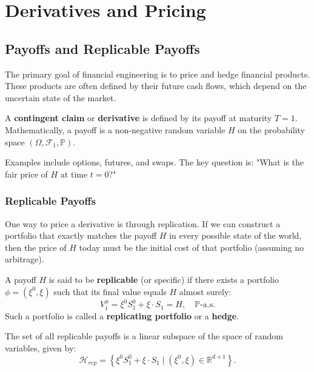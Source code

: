 \chapter{Derivatives and Pricing}

\section{Payoffs and Replicable Payoffs}

The primary goal of financial engineering is to price and hedge financial products. These products are often defined by their future cash flows, which depend on the uncertain state of the market.

\begin{definition}[Payoff]
A \textbf{contingent claim} or \textbf{derivative} is defined by its payoff at maturity $T=1$.
Mathematically, a payoff is a non-negative random variable $H$ on the probability space $(\Omega, \mathcal{F}_1, \mathbb{P})$.
\end{definition}

Examples include options, futures, and swaps. The key question is: "What is the fair price of $H$ at time $t=0$?"

\subsection{Replicable Payoffs}

One way to price a derivative is through replication. If we can construct a portfolio that exactly matches the payoff $H$ in every possible state of the world, then the price of $H$ today must be the initial cost of that portfolio (assuming no arbitrage).

\begin{definition}
A payoff $H$ is said to be \textbf{replicable} (or specific) if there exists a portfolio $\phi = (\xi^0, \xi)$ such that its final value equals $H$ almost surely:
\begin{equation}
    V_1^\phi = \xi^0 S_1^0 + \xi \cdot S_1 = H, \quad \mathbb{P}\text{-a.s.}
\end{equation}
Such a portfolio is called a \textbf{replicating portfolio} or a \textbf{hedge}.
\end{definition}

The set of all replicable payoffs is a linear subspace of the space of random variables, given by:
\begin{equation}
    \mathcal{H}_{rep} = \left\{ \xi^0 S_1^0 + \xi \cdot S_1 \mid (\xi^0, \xi) \in \mathbb{R}^{d+1} \right\}.
\end{equation}

